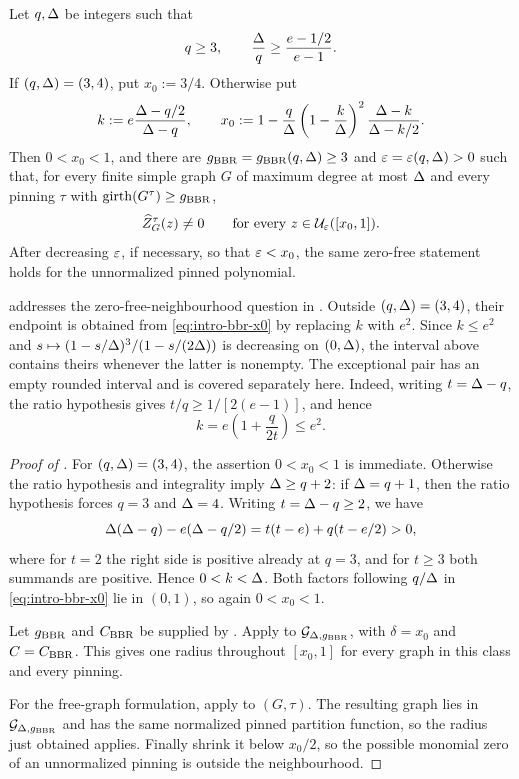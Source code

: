 \begin{theorem}
\label{thm:intro-bbr-interval}
Let \(q,\Delta\) be integers such that
\[
  q\ge3,
  \qquad
  \frac{\Delta}{q}\ge\frac{e-1/2}{e-1}.
\]
If \((q,\Delta)=(3,4)\), put \(x_0:=3/4\).  Otherwise put
\begin{equation}
  k:=e\frac{\Delta-q/2}{\Delta-q},
  \qquad
  x_0:=1-\frac q{\Delta}
       \left(1-\frac{k}{\Delta}\right)^2
       \frac{\Delta-k}{\Delta-k/2}.
  \label{eq:intro-bbr-x0}
\end{equation}
Then \(0<x_0<1\), and there are
\(g_{\rm BBR}=g_{\rm BBR}(q,\Delta)\ge3\) and
\(\varepsilon=\varepsilon(q,\Delta)>0\) such that, for every finite simple graph \(G\)
of maximum degree at most \(\Delta\) and every pinning \(\tau\) with
\(\operatorname{girth}(G^\tau)\ge g_{\rm BBR}\),
\[
  \widehat Z_{G}^{\tau}(z)\ne0
  \qquad\text{for every }z\in\mathcal U_\varepsilon([x_0,1]).
\]
After decreasing \(\varepsilon\), if necessary, so that \(\varepsilon<x_0\), the same
zero-free statement holds for the unnormalized pinned polynomial.
\end{theorem}

 addresses the zero-free-neighbourhood question
in \cite[Section~5]{BencsBerrekkalRegts2025Trees}.
Outside \((q,\Delta)=(3,4)\), their endpoint is obtained from
\eqref{eq:intro-bbr-x0} by replacing \(k\) with \(e^2\).
Since \(k\le e^2\) and
\(s\mapsto(1-s/\Delta)^3/(1-s/(2\Delta))\) is decreasing on
\((0,\Delta)\), the interval above contains theirs whenever the latter is
nonempty.  The exceptional pair has an empty rounded interval and is
covered separately here.
Indeed, writing \(t=\Delta-q\), the ratio hypothesis gives
\(t/q\ge1/[2(e-1)]\), and hence
\[
  k=e\left(1+\frac{q}{2t}\right)\le e^2.
\]

\begin{proof}[Proof of ]
For \((q,\Delta)=(3,4)\), the assertion \(0<x_0<1\) is immediate.
Otherwise the ratio hypothesis and integrality imply
\(\Delta\ge q+2\): if \(\Delta=q+1\), then the ratio hypothesis forces
\(q=3\) and \(\Delta=4\).  Writing \(t=\Delta-q\ge2\), we have
\[
  \Delta(\Delta-q)-e(\Delta-q/2)
  =t(t-e)+q(t-e/2)>0,
\]
where for \(t=2\) the right side is positive already at \(q=3\), and
for \(t\ge3\) both summands are positive.  Hence \(0<k<\Delta\).  Both
factors following \(q/\Delta\) in \eqref{eq:intro-bbr-x0} lie in
\((0,1)\), so again \(0<x_0<1\).

Let \(g_{\rm BBR}\) and \(C_{\rm BBR}\) be supplied by
.  Apply
 to
\(\mathcal{G}_{\Delta,g_{\rm BBR}}\), with \(\delta=x_0\) and
\(C=C_{\rm BBR}\).  This gives one radius throughout \([x_0,1]\) for
every graph in this class and every pinning.

For the free-graph formulation, apply
 to \((G,\tau)\).  The resulting graph
lies in \(\mathcal{G}_{\Delta,g_{\rm BBR}}\) and has the same normalized pinned
partition function, so the radius just obtained applies.  Finally shrink
it below \(x_0/2\), so the possible monomial zero of an unnormalized
pinning is outside the neighbourhood.
\end{proof}

